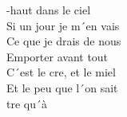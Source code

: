  -haut dans le ciel \\
Si un jour je m´en vais \\
Ce que je drais de nous \\
Emporter avant tout \\
C´est le cre, et le miel \\
Et le peu que l´on sait \\
tre qu´à   

